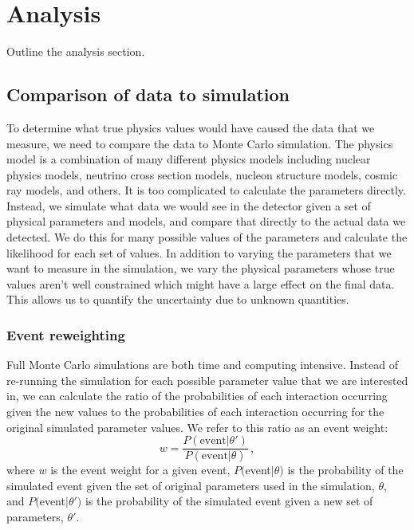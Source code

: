 \section{Analysis}\label{analysis}
\hspace{\parindent}
Outline the analysis section.

\subsection{Comparison of data to simulation}
  To determine what true physics values would have caused the data that we
  measure, we need to compare the data to Monte Carlo simulation. The physics
  model is a combination of many different physics models including nuclear
  physics models, neutrino cross section models, nucleon structure models,
  cosmic ray models, and others. It is too complicated to calculate the
  parameters directly. Instead, we simulate what data we would see in the
  detector given a set of physical parameters and models, and compare that
  directly to the actual data we detected. We do this for many possible values
  of the parameters and calculate the likelihood for each set of values. In
  addition to varying the parameters that we want to measure in the simulation,
  we vary the physical parameters whose true values aren't well constrained
  which might have a large effect on the final data. This allows us to quantify
  the uncertainty due to unknown quantities.
  \subsubsection{Event reweighting}\label{sec:reweighting}
    Full Monte Carlo simulations are both time and computing intensive. Instead
    of re-running the simulation for each possible parameter value that we are
    interested in, we can calculate the ratio of the probabilities of each
    interaction occurring given the new values to the probabilities of each
    interaction occurring for the original simulated parameter values. We refer
    to this ratio as an event weight:
    \begin{equation}
      w = \frac{P(\textrm{event}|\theta')}{P(\textrm{event}|\theta)} \,,
    \end{equation}
    where $w$ is the event weight for a given event, $P($event$|\theta)$ is the
    probability of the simulated event given the set of original parameters
    used in the simulation, $\theta$, and $P($event$|\theta')$ is the
    probability of the simulated event given a new set of parameters,
    $\theta'$.


